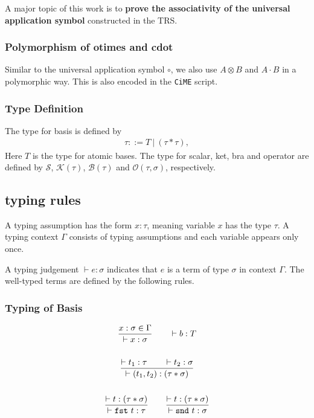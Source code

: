 A major topic of this work is to \textbf{prove the associativity of the universal application symbol} constructed in the TRS.

\subsubsection*{Polymorphism of otimes and cdot}
Similar to the universal application symbol $\circ$, we also use $A \otimes B$ and $A \cdot B$ in a polymorphic way. This is also encoded in the \texttt{CiME} script.



\subsubsection*{Type Definition}

\begin{definition}[Types]
  The type for basis is defined by
  \begin{align*}
    \tau ::= T\ |\ (\tau * \tau),
  \end{align*}
  Here $T$ is the type for atomic bases.
  The type for scalar, ket, bra and operator are defined by $\mathcal{S}$, $\mathcal{K}(\tau)$, $\mathcal{B}(\tau)$ and $\mathcal{O}(\tau, \sigma)$, respectively.
\end{definition}

\subsection{typing rules}
  A typing assumption has the form $x : \tau$, meaning variable $x$ has the type $\tau$. A typing context $\Gamma$ consists of typing assumptions and each variable appears only once.

  A typing judgement $\vdash e : \sigma$ indicates that $e$ is a term of type $\sigma$ in context $\Gamma$. The well-typed terms are defined by the following rules.

\subsubsection*{Typing of Basis}
  \begin{gather*}
    \frac{x : \sigma \in \Gamma}{\vdash x : \sigma}
    \qquad 
    \vdash b : T\\
    \\
    \frac{\vdash t_1 : \tau \qquad \vdash t_2 : \sigma}{\vdash (t_1, t_2) : ( \tau * \sigma )} \\
    \\
    \frac{\vdash t : ( \tau * \sigma )}{\vdash \texttt{fst}\ t : \tau}
    \qquad
    \frac{\vdash t : ( \tau * \sigma )}{\vdash \texttt{snd}\ t : \sigma}
  \end{gather*}

